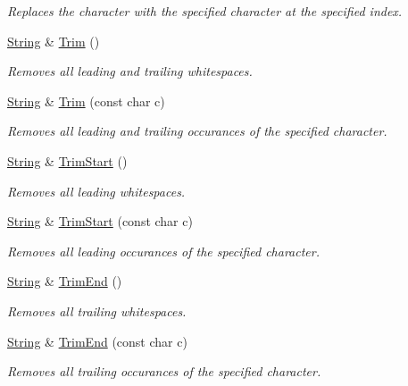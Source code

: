 \begin{DoxyCompactItemize}
\begin{DoxyCompactList}\small\item\em Replaces the character with the specified character at the specified index. \end{DoxyCompactList}\item 
\hyperlink{class_power_1_1_string}{String} \& \hyperlink{class_power_1_1_string_a5fb76a178082f7fc2533745941558452}{Trim} ()
\begin{DoxyCompactList}\small\item\em Removes all leading and trailing whitespaces. \end{DoxyCompactList}\item 
\hyperlink{class_power_1_1_string}{String} \& \hyperlink{class_power_1_1_string_a320511195a45fdb130083151a45bcf2d}{Trim} (const char c)
\begin{DoxyCompactList}\small\item\em Removes all leading and trailing occurances of the specified character. \end{DoxyCompactList}\item 
\hyperlink{class_power_1_1_string}{String} \& \hyperlink{class_power_1_1_string_a7c1c035836c4c42b4d6a118b7035742e}{Trim\+Start} ()
\begin{DoxyCompactList}\small\item\em Removes all leading whitespaces. \end{DoxyCompactList}\item 
\hyperlink{class_power_1_1_string}{String} \& \hyperlink{class_power_1_1_string_a1c0bda3a9e8ac38157413bcce1600d14}{Trim\+Start} (const char c)
\begin{DoxyCompactList}\small\item\em Removes all leading occurances of the specified character. \end{DoxyCompactList}\item 
\hyperlink{class_power_1_1_string}{String} \& \hyperlink{class_power_1_1_string_ac5607bfb0efda47bafa4271a7ce6a3a9}{Trim\+End} ()
\begin{DoxyCompactList}\small\item\em Removes all trailing whitespaces. \end{DoxyCompactList}\item 
\hyperlink{class_power_1_1_string}{String} \& \hyperlink{class_power_1_1_string_a7d7f493bed421a3919144c66fcb38121}{Trim\+End} (const char c)
\begin{DoxyCompactList}\small\item\em Removes all trailing occurances of the specified character. \end{DoxyCompactList}\item 

\end{DoxyCompactItemize}
